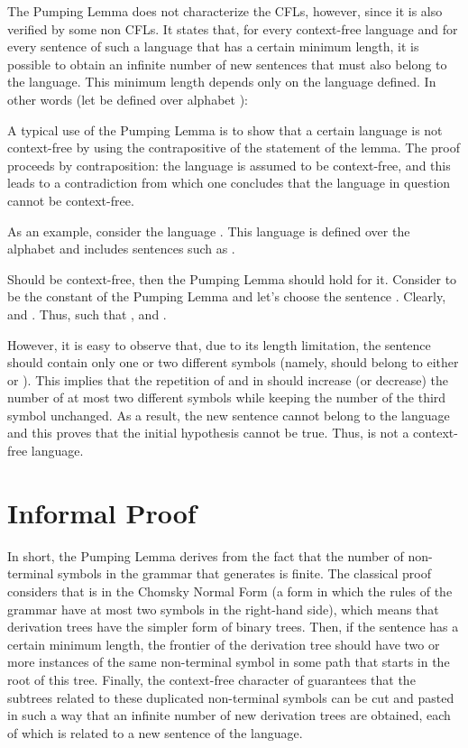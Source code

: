 \documentclass {elsarticle}
\begin{document}
The Pumping Lemma does not characterize the CFLs, however, since it is also verified by some non CFLs. It states that, for every context-free language and for every sentence of such a language that has a certain minimum length, it is possible to obtain an infinite number of new sentences that must also belong to the language. This minimum length depends only on the language defined. In other words (let  be defined over alphabet ):






A typical use of the Pumping Lemma is to show that a certain language is not context-free by using the contrapositive of the statement of the lemma. The proof proceeds by contraposition: the language is assumed to be context-free, and this leads to a contradiction from which one concludes that the language in question cannot be context-free. 

As an example, consider the language . This language is defined over the alphabet  and includes sentences such as .

Should  be context-free, then the Pumping Lemma should hold for it. Consider  to be the constant of the Pumping Lemma and let's choose the sentence . Clearly,  and . Thus,  such that ,  and . 

However, it is easy to observe that, due to its length limitation, the sentence  should contain only one or two different symbols (namely,  should belong to either  or ). This implies that the repetition of  and  in  should increase (or decrease) the number of at most two different symbols while keeping the number of the third symbol unchanged. As a result, the new sentence cannot belong to the language and this proves that the initial hypothesis cannot be true. Thus,  is not a context-free language.

\section {Informal Proof}
\label {sec-informal}

In short, the Pumping Lemma derives from the fact that the number of non-terminal symbols in the grammar  that generates  is finite. The classical proof considers that  is in the Chomsky Normal Form (a form in which the rules of the grammar have at most two symbols in the right-hand side), which means that derivation trees have the simpler form of binary trees. Then, if the sentence has a certain minimum length, the frontier of the derivation tree should have two or more instances of the same non-terminal symbol in some path that starts in the root of this tree. Finally, the context-free character of  guarantees that the subtrees related to these duplicated non-terminal symbols can be cut and pasted in such a way that an infinite number of new derivation trees are obtained, each of which is related to a new sentence of the language.
\end{document}
